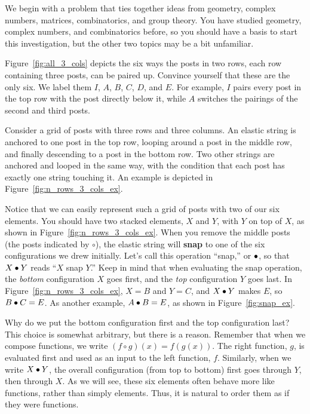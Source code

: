 \documentclass[../textbook.tex]{subfiles}
\begin{document}

\noindent We begin with a problem that ties together ideas from geometry, complex numbers, matrices, combinatorics, and group theory.
You have studied geometry, complex numbers, and combinatorics before, so you should have a basis to start this investigation, but the other two topics may be a bit unfamiliar.

Figure~\ref{fig:all_3_cols} depicts the six ways the posts in two rows, each row containing three posts, can be paired up. Convince yourself that these are the only six. We label them $I$, $A$, $B$, $C$, $D$, and $E$. For example, $I$ pairs every post in the top row with the post directly below it, while $A$ switches the pairings of the second and third posts.

Consider a grid of posts with three rows and three columns.
An elastic string is anchored to one post in the top row, looping around a post in the middle row, and finally descending to a post in the bottom row.
Two other strings are anchored and looped in the same way, with the condition that each post has exactly one string touching it.
An example is depicted in Figure~\ref{fig:n_rows_3_cols_ex}.

Notice that we can easily represent such a grid of posts with two of our six elements. You should have two stacked elements, $X$ and $Y$, with $Y$ on top of $X$, as shown in Figure~\ref{fig:n_rows_3_cols_ex}.
When you remove the middle posts (the posts indicated by $\circ$), the elastic string will \textbf{snap} to one of the six configurations we drew initially.
Let's call this operation ``snap,'' or $\bullet$, so that $X\bullet Y$ reads ``$X$ snap $Y$.''
Keep in mind that when evaluating the snap operation, the \textit{bottom} configuration $X$ goes first, and the \textit{top} configuration $Y$ goes last.
In Figure~\ref{fig:n_rows_3_cols_ex}, $X=B$ and $Y=C$, and $X\bullet Y$ makes $E$, so $B\bullet C = E$.
As another example, $A\bullet B = E$, as shown in Figure~\ref{fig:snap_ex}.

Why do we put the bottom configuration first and the top configuration last? This choice is somewhat arbitrary, but there is a reason. Remember that when we compose functions, we write $(f \circ g)(x)=f(g(x))$. The right function, $g$, is evaluated first and used as an input to the left function, $f$. Similarly, when we write $X\bullet Y$, the overall configuration (from top to bottom) first goes through $Y$, then through $X$. As we will see, these six elements often behave more like functions, rather than simply elements. Thus, it is natural to order them as if they were functions.
\end{document}
